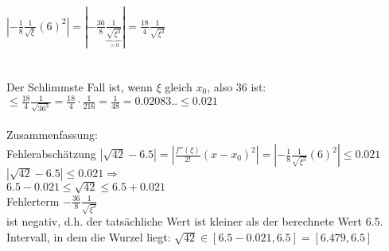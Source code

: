 \documentclass[12pt,a4paper]{article}
\begin{document}
$\left|-\frac{1}{8}\frac{1}{\sqrt{\xi}}(6)^2\right|=\left|-\frac{36}{8}\frac{1}{\underbrace{\sqrt{\xi^3}}_{>0}}\right|=\frac{18}{4}\frac{1}{\sqrt{\xi^3}}$\\
\\
\\
Der Schlimmste Fall ist, wenn $\xi$ gleich $x_0$, also 36 ist:\\
$\leq\frac{18}{4}\frac{1}{\sqrt{36^3}}=\frac{18}{4}\cdot\frac{1}{216}=\frac{1}{48}=0.02083..\leq 0.021$\\
\\
Zusammenfassung:\\
Fehlerabschätzung  $\left|\sqrt{42}-6.5\right|=\left|\frac{f''(\xi)}{2!}\left(x-x_0\right)^2\right|=\left|-\frac{1}{8}\frac{1}{\sqrt{\xi^3}}(6)^2\right|\leq 0.021$\\
\hspace*{1cm}$\left|\sqrt{42}-6.5\right|\leq 0.021\Rightarrow$\\
\hspace*{1cm}$6.5-0.021\leq\sqrt{42}\leq 6.5+0.021$\\
Fehlerterm $-\frac{36}{8}\frac{1}{\sqrt{\xi^3}}$\\
ist negativ, d.h. der tatsächliche Wert ist kleiner als der berechnete Wert 6.5.\\
Intervall, in dem die Wurzel liegt:
\hspace*{1cm}$\sqrt{42}\in\left[6.5-0.021, 6.5\right]=\left[6.479, 6.5\right]$\\
\end{document}
